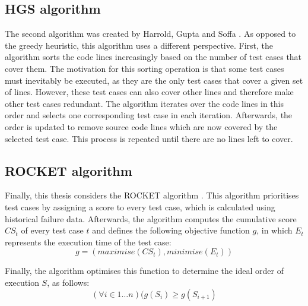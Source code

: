 \subsection{HGS algorithm}
\noindent The second algorithm was created by Harrold, Gupta and Soffa \cite{hgs}. As opposed to the greedy heuristic, this algorithm uses a different perspective. First, the algorithm sorts the code lines increasingly based on the number of test cases that cover them. The motivation for this sorting operation is that some test cases must inevitably be executed, as they are the only test cases that cover a given set of lines. However, these test cases can also cover other lines and therefore make other test cases redundant. The algorithm iterates over the code lines in this order and selects one corresponding test case in each iteration. Afterwards, the order is updated to remove source code lines which are now covered by the selected test case. This process is repeated until there are no lines left to cover.

\clearpage

\subsection{ROCKET algorithm}
\noindent Finally, this thesis considers the ROCKET algorithm \cite{6676952}. This algorithm prioritises test cases by assigning a score to every test case, which is calculated using historical failure data. Afterwards, the algorithm computes the cumulative score $CS_t$ of every test case $t$ and defines the following objective function $g$, in which $E_t$ represents the execution time of the test case:
$$g = (maximise(CS_t), minimise(E_t))$$

\noindent Finally, the algorithm optimises this function to determine the ideal order of execution $S$, as follows:
$$(\forall i \in 1 \dots n)(g(S_i) \ge g(S_{i+1})$$